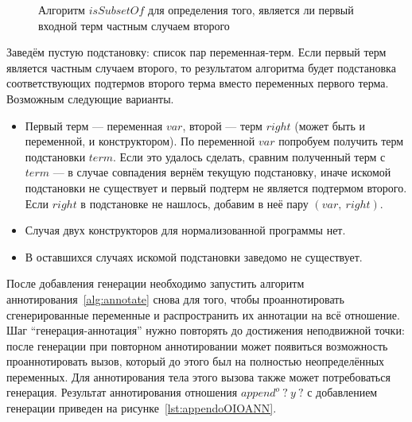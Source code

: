 \begin{figure}[h!]
  \begin{center}
  \begin{minipage}{1.1\textwidth}
\begin{algorithm}[H]
\end{algorithm}
  \end{minipage}
  \end{center}
  \caption{Алгоритм $isSubsetOf$ для определения того, является ли первый входной терм частным случаем второго}
  \label{alg:isSubsetOf}
\end{figure}

Заведём пустую подстановку: список пар переменная-терм.
Если первый терм является частным случаем второго, то результатом алгоритма будет подстановка соответствующих подтермов второго терма вместо переменных первого терма.
Возможным следующие варианты.
\begin{itemize}
    \item Первый терм --- переменная $var$, второй --- терм $right$ (может быть и переменной, и конструктором).
    По переменной $var$ попробуем получить терм подстановки $term$.
    Если это удалось сделать, сравним полученный терм с $term$ --- в случае совпадения вернём текущую подстановку, иначе искомой подстановки не существует и первый подтерм не является подтермом второго.
    Если $right$ в подстановке не нашлось, добавим в неё пару $(var,~right)$.
    \item Случая двух конструкторов для нормализованной программы нет.
    \item В оставшихся случаях искомой подстановки заведомо не существует.
\end{itemize}

После добавления генерации необходимо запустить алгоритм аннотирования~\ref{alg:annotate} снова для того, чтобы проаннотировать сгенерированные переменные и распространить их аннотации на всё отношение.
Шаг ``генерация-аннотация'' нужно повторять до достижения неподвижной точки: после генерации при повторном аннотировании может появиться возможность проаннотировать вызов, который до этого был на полностью неопределённых переменных.
Для аннотирования тела этого вызова также может потребоваться генерация.
Результат аннотирования отношения $append^o \ ? \ y \ ?$ с добавлением генерации приведен на рисунке~\ref{lst:appendoOIOANN}.

